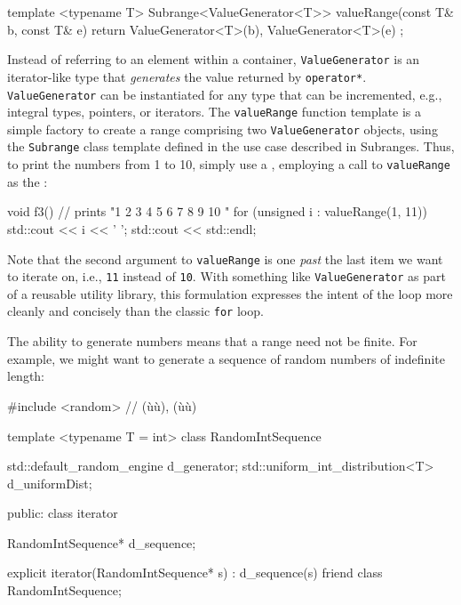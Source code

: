 {{\begin{emcppslisting}[emcppsbatch=e2]
template <typename T>
Subrange<ValueGenerator<T>> valueRange(const T& b, const T& e)
{
    return { ValueGenerator<T>(b), ValueGenerator<T>(e) };
}
\end{emcppslisting}
    

\noindent Instead of referring to an element within a container,
\lstinline!ValueGenerator! is an iterator-like type that \emph{generates}
the value returned by \lstinline!operator*!. \lstinline!ValueGenerator! can be
instantiated for any type that can be incremented, e.g., integral types,
pointers, or iterators. The \lstinline!valueRange! function template is a
simple factory to create a range comprising two \lstinline!ValueGenerator!
objects, using the \lstinline!Subrange! class template defined in the use
case described in {Subranges}. Thus, to print the numbers from 1 to 10,
simply use a , employing a call to
\lstinline!valueRange! as the :

\begin{emcppslisting}[emcppsbatch=e2]
void f3()
{
    // prints "1 2 3 4 5 6 7 8 9 10 "
    for (unsigned i : valueRange(1, 11))
    {
        std::cout << i << ' ';
    }
    std::cout << std::endl;
}
\end{emcppslisting}
    

\noindent Note that the second argument to \lstinline!valueRange! is one \emph{past}
the last item we want to iterate on, i.e., \lstinline!11! instead of
\lstinline!10!. With something like \lstinline!ValueGenerator! as part of a
reusable utility library, this formulation expresses the intent of the
loop more cleanly and concisely than the classic \lstinline!for! loop.

The ability to generate numbers means that a range need not be finite.
For example, we might want to generate a sequence of random numbers of
indefinite length:

\begin{emcppslisting}[emcppsbatch=e2]
#include <random>  // (ù{}ù), (ù{}ù)

template <typename T = int>
class RandomIntSequence
{
    std::default_random_engine       d_generator;
    std::uniform_int_distribution<T> d_uniformDist;

public:
    class iterator
    {
        RandomIntSequence* d_sequence;

        explicit iterator(RandomIntSequence* s) : d_sequence(s) { }
        friend class RandomIntSequence;

}}
\end{emcppslisting}}}
